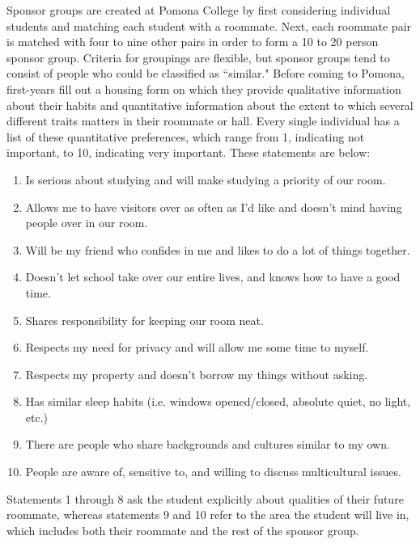 \documentclass[letterpaper]{article}
\begin{document}
Sponsor groups are created at Pomona College by first considering individual students and matching each student with a roommate. Next, each roommate pair is matched with four to nine other pairs in order to form a 10 to 20 person sponsor group. Criteria for groupings are flexible, but sponsor groups tend to consist of people who could be classified as ``similar." Before coming to Pomona, first-years fill out a housing form on which they provide qualitative information about their habits and quantitative information about the extent to which several different traits matters in their roommate or hall. Every single individual has a list of these quantitative preferences, which range from 1, indicating not important, to 10, indicating very important. These statements are below: 

\begin{enumerate}
\item Is serious about studying and will make studying a priority of our room.
\item Allows me to have visitors over as often as I'd like and doesn't mind having people over in our room.
\item Will be my friend who confides in me and likes to do a lot of things together.
\item Doesn't let school take over our entire lives, and knows how to have a good time.
\item Shares responsibility for keeping our room neat.
\item Respects my need for privacy and will allow me some time to myself.
\item Respects my property and doesn't borrow my things without asking.
\item Has similar sleep habits (i.e. windows opened/closed, absolute quiet, no light, etc.)
\item There are people who share backgrounds and cultures similar to my own.
\item People are aware of, sensitive to, and willing to discuss multicultural issues.
\end{enumerate}

Statements 1 through 8 ask the student explicitly about qualities of their future roommate, whereas statements 9 and 10 refer to the area the student will live in, which includes both their roommate and the rest of the sponsor group. 


\end{document}

